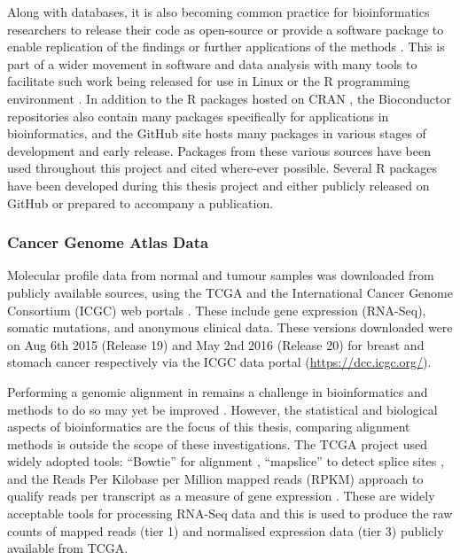Along with databases, it is also becoming common practice for bioinformatics researchers to release their code as open-source or provide a software package to enable replication of the findings or further applications of the methods \citep{Stajich2006}. This is part of a wider movement in software and data analysis with many tools to facilitate such work being released for use in Linux or the R programming environment \citep{R_core}. In addition to the R packages hosted on CRAN \citep{CRAN}, the Bioconductor repositories \citep{Gentleman2004} also contain many packages specifically for applications in bioinformatics, and the GitHub site hosts many packages in various stages of development and early release. Packages from these various sources have been used throughout this project and cited where-ever possible. Several R packages have been developed during this thesis project and either publicly released on GitHub or prepared to accompany a publication.

\subsubsection{Cancer Genome Atlas Data}
Molecular profile data from normal and tumour samples was downloaded from publicly available sources, using the TCGA \citep{TCGA2012} and the International Cancer Genome Consortium (ICGC) web portals \citep{ICGC2011}. These include gene expression (RNA-Seq), somatic mutations, and anonymous clinical data. These versions downloaded were on Aug 6th 2015 (Release 19) and May 2nd 2016 (Release 20) for breast and stomach cancer respectively via the ICGC data portal (\url{https://dcc.icgc.org/}).

Performing a genomic alignment in remains a challenge in bioinformatics and methods to do so may yet be improved \citep{Chen2010}. However, the statistical and biological aspects of bioinformatics are the focus of this thesis, comparing alignment methods is outside the scope of these investigations. The TCGA project \citep{TCGA2012} used widely adopted tools: ``Bowtie''  for alignment \citep{bowtie}, ``mapslice'' to detect splice sites \citep{mapsplice}, and the Reads Per Kilobase per Million mapped reads (RPKM) approach to qualify reads per transcript as a measure of gene expression \citep{Mortazavi2008}. These are widely acceptable tools for processing RNA-Seq data and this is used to produce the raw counts of mapped reads (tier 1) and normalised expression data (tier 3) publicly available from TCGA.

